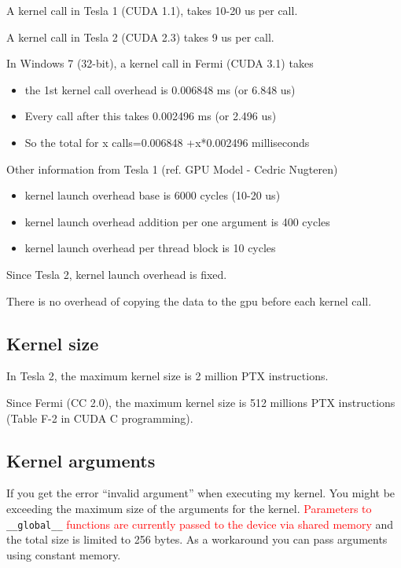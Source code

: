A kernel call in Tesla 1 (CUDA 1.1), takes 10-20 us per call. 

A kernel call in Tesla 2 (CUDA 2.3) takes 9 us per call.

In Windows 7 (32-bit), a kernel call in Fermi (CUDA 3.1) takes
\begin{itemize}
\item the 1st kernel call overhead is 0.006848 ms (or 6.848 us)
\item  Every call after this takes 0.002496 ms (or 2.496 us)
\item  So the total for x calls=0.006848 +x*0.002496 milliseconds
\end{itemize}

Other information from Tesla 1 (ref. GPU Model - Cedric Nugteren)
\begin{itemize}
\item kernel launch overhead base is 6000 cycles (10-20 us)
\item kernel launch overhead addition per one argument is 400 cycles
\item kernel launch overhead per thread block is 10 cycles
\end{itemize}
Since Tesla 2, kernel launch overhead is fixed. 


There is no overhead of copying the data to the gpu before each kernel
call. 

\subsection{Kernel size}
\label{sec:kernel-size}

In Tesla 2, the maximum kernel size is 2 million PTX instructions.

Since Fermi (CC 2.0), the maximum kernel size is 512 millions PTX instructions
(Table F-2 in CUDA C programming).

\subsection{Kernel arguments}
\label{sec:kernel-arguments}

If you get the error ``invalid argument'' when executing my
kernel. You might be exceeding the maximum size of the arguments for
the kernel.  \textcolor{red}{Parameters to} \verb!__global__!
\textcolor{red}{functions are currently passed to the device via
  shared memory}
and the total size is limited to 256 bytes.  As a workaround you can
pass arguments using constant memory.

